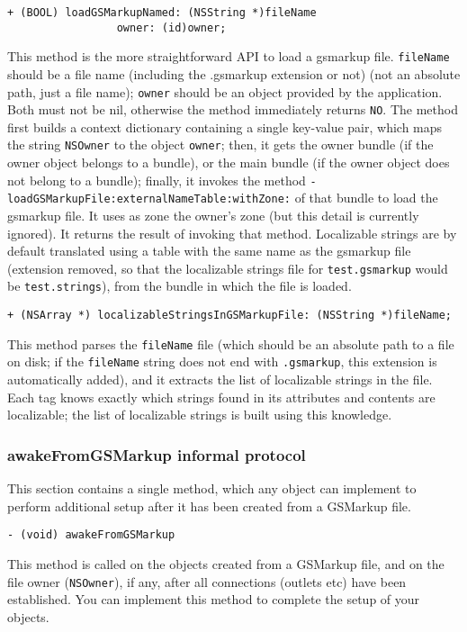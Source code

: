 \begin{verbatim}
+ (BOOL) loadGSMarkupNamed: (NSString *)fileName
                 owner: (id)owner;
\end{verbatim}
This method is the more straightforward API to load a gsmarkup file.
\texttt{fileName} should be a file name (including the .gsmarkup
extension or not) (not an absolute path, just a file name);
\texttt{owner} should be an object provided by the application.  Both
must not be nil, otherwise the method immediately returns \texttt{NO}.
The method first builds a context dictionary containing a single
key-value pair, which maps the string \texttt{NSOwner} to the object
\texttt{owner}; then, it gets the owner bundle (if the owner object
belongs to a bundle), or the main bundle (if the owner object does not
belong to a bundle); finally, it invokes the method
\texttt{-loadGSMarkupFile:externalNameTable:withZone:} of that bundle to load
the gsmarkup file.  It uses as zone the owner's zone (but this detail is
currently ignored).  It returns the result of invoking that method.
Localizable strings are by default translated using a table with the
same name as the gsmarkup file (extension removed, so that the localizable
strings file for \texttt{test.gsmarkup} would be \texttt{test.strings}),
from the bundle in which the file is loaded.

\begin{verbatim}
+ (NSArray *) localizableStringsInGSMarkupFile: (NSString *)fileName;
\end{verbatim}
This method parses the \texttt{fileName} file (which should be an
absolute path to a file on disk; if the \texttt{fileName} string does
not end with \texttt{.gsmarkup}, this extension is automatically added),
and it extracts the list of localizable strings in the file.  Each tag
knows exactly which strings found in its attributes and contents are
localizable; the list of localizable strings is built using this
knowledge.

\subsubsection{awakeFromGSMarkup informal protocol}
This section contains a single method, which any object can implement
to perform additional setup after it has been created from a GSMarkup
file.
\begin{verbatim}
- (void) awakeFromGSMarkup
\end{verbatim}
This method is called on the objects created from a GSMarkup file, and
on the file owner (\texttt{NSOwner}), if any, after all connections
(outlets etc) have been established.  You can implement this method to
complete the setup of your objects.


